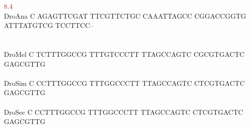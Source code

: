\documentclass[11pt,twoside,reqno,a4paper]{article}
\begin{document}
{\hspace*{7\charwidth}\hspace*{1\charwidth}\hspace*{1\charwidth}\hspace*{1\charwidth}\hspace*{22\charwidth}\textcolor{Brown}{8.4}\hspace*{1\charwidth}\hspace*{1\charwidth}\hspace*{1\charwidth}\\
DroAna	C	AGAGTTCGAT	TTCGTTCTGC	CAAATTAGCC	CGGACCGGTG	ATTTATGTCG	TCCTTCC--\\
\hspace*{7\charwidth}\hspace*{1\charwidth}\hspace*{1\charwidth}\hspace*{1\charwidth}\hspace*{1\charwidth}\hspace*{1\charwidth}\hspace*{1\charwidth}\\
\\
DroMel	C	TCTTTGGCCG	TTTGTCCCTT	TTAGCCAGTC	CGCGTGACTC	GAGCGTTG\\
\hspace*{7\charwidth}\hspace*{1\charwidth}\hspace*{1\charwidth}\hspace*{1\charwidth}\hspace*{1\charwidth}\hspace*{1\charwidth}\\
DroSim	C	CCTTTGGCCG	TTTGGCCCTT	TTAGCCAGTC	CTCGTGACTC	GAGCGTTG\\
\hspace*{7\charwidth}\hspace*{1\charwidth}\hspace*{1\charwidth}\hspace*{1\charwidth}\hspace*{1\charwidth}\hspace*{1\charwidth}\\
DroSec	C	CCTTTGGCCG	TTTGGCCCTT	TTAGCCAGTC	CTCGTGACTC	GAGCGTTG\\
\hspace*{7\charwidth}\hspace*{1\charwidth}\hspace*{1\charwidth}\hspace*{1\charwidth}\hspace*{1\charwidth}\hspace*{1\charwidth}\\
}
\end{document}
